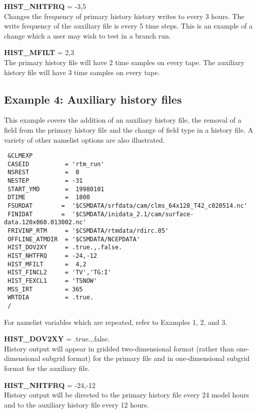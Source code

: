 \medskip \noindent 
{\bf HIST\_NHTFRQ} = -3,5 \\ 
Changes the frequency of primary history history writes to every 3
hours.  The write frequency of the auxiliary file is every 5 time
steps.  This is an example of a change which a user may wish to test
in a branch run.

\medskip \noindent 
{\bf HIST\_MFILT} =  2,3 \\
The primary history file will have 2 time samples on every tape. The
auxiliary history file will have 3 time samples on every tape.

\subsection {Example 4: Auxiliary history files}

\noindent 
This example covers the addition of an auxiliary history file, the
removal of a field from the primary history file and the change of
field type in a history file. A variety of other namelist options are
also illustrated.

\begin{verbatim}
 &CLMEXP    
 CASEID          = 'rtm_run' 
 NSREST          =  0 
 NESTEP          = -31 
 START_YMD       =  19980101 
 DTIME           =  1800 
 FSURDAT        =  '$CSMDATA/srfdata/cam/clms_64x128_T42_c020514.nc'
 FINIDAT        =  '$CSMDATA/inidata_2.1/cam/surface-data.120x060.013002.nc' 
 FRIVINP_RTM     = '$CSMDATA/rtmdata/rdirc.05' 
 OFFLINE_ATMDIR  = '$CSMDATA/NCEPDATA' 
 HIST_DOV2XY     = .true.,.false. 
 HIST_NHTFRQ     = -24,-12 
 HIST_MFILT      =  4,2 
 HIST_FINCL2     = 'TV','TG:I'
 HIST_FEXCL1     = 'TSNOW'
 MSS_IRT         = 365  
 WRTDIA          = .true. 
 / 
\end{verbatim}

\medskip \noindent 
For namelist variables which are repeated, refer to Examples 1, 2, and 3.

\medskip \noindent 
{\bf HIST\_DOV2XY} = .true.,.false. \\ 
History output will appear in gridded two-dimensional format
(rather than one-dimensional subgrid format) for the primary file and in
one-dimensional subgrid format for the auxiliary file.

\medskip \noindent 
{\bf HIST\_NHTFRQ} = -24,-12 \\ 
History output will be directed to the primary history file every 24
model hours and to the auxiliary history file every 12 hours.

